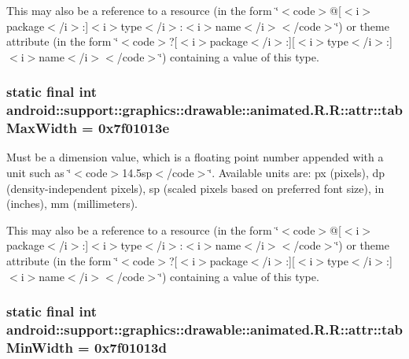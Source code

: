 This may also be a reference to a resource (in the form \char`\"{}$<$code$>$@\mbox{[}$<$i$>$package$<$/i$>$:\mbox{]}$<$i$>$type$<$/i$>$:$<$i$>$name$<$/i$>$$<$/code$>$\char`\"{}) or theme attribute (in the form \char`\"{}$<$code$>$?\mbox{[}$<$i$>$package$<$/i$>$:\mbox{]}\mbox{[}$<$i$>$type$<$/i$>$:\mbox{]}$<$i$>$name$<$/i$>$$<$/code$>$\char`\"{}) containing a value of this type. \hypertarget{classandroid_1_1support_1_1graphics_1_1drawable_1_1animated_1_1_r_1_1attr_8fa8b3690ae2e389a4d3f6f5ab73f8b0}{
\subsubsection[{tabMaxWidth}]{\setlength{\rightskip}{0pt plus 5cm}static final int android::support::graphics::drawable::animated.R.R::attr::tabMaxWidth = 0x7f01013e}}
\label{classandroid_1_1support_1_1graphics_1_1drawable_1_1animated_1_1_r_1_1attr_8fa8b3690ae2e389a4d3f6f5ab73f8b0}


Must be a dimension value, which is a floating point number appended with a unit such as \char`\"{}$<$code$>$14.5sp$<$/code$>$\char`\"{}. Available units are: px (pixels), dp (density-independent pixels), sp (scaled pixels based on preferred font size), in (inches), mm (millimeters). 

This may also be a reference to a resource (in the form \char`\"{}$<$code$>$@\mbox{[}$<$i$>$package$<$/i$>$:\mbox{]}$<$i$>$type$<$/i$>$:$<$i$>$name$<$/i$>$$<$/code$>$\char`\"{}) or theme attribute (in the form \char`\"{}$<$code$>$?\mbox{[}$<$i$>$package$<$/i$>$:\mbox{]}\mbox{[}$<$i$>$type$<$/i$>$:\mbox{]}$<$i$>$name$<$/i$>$$<$/code$>$\char`\"{}) containing a value of this type. \hypertarget{classandroid_1_1support_1_1graphics_1_1drawable_1_1animated_1_1_r_1_1attr_298a5027820cc88824e6a3668d61fcb0}{
\subsubsection[{tabMinWidth}]{\setlength{\rightskip}{0pt plus 5cm}static final int android::support::graphics::drawable::animated.R.R::attr::tabMinWidth = 0x7f01013d}}
\label{classandroid_1_1support_1_1graphics_1_1drawable_1_1animated_1_1_r_1_1attr_298a5027820cc88824e6a3668d61fcb0}


